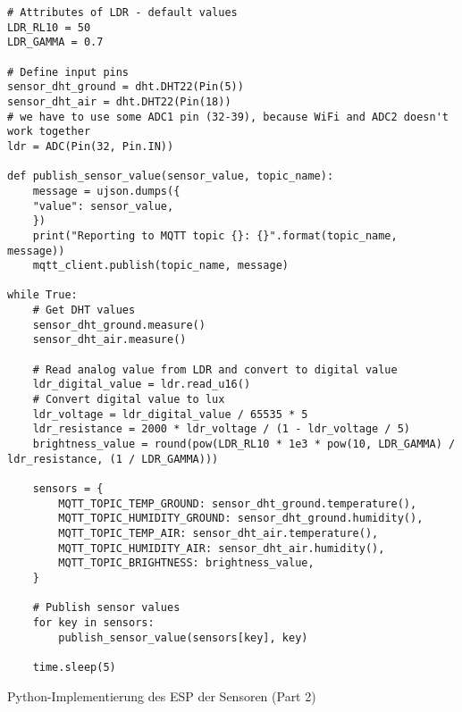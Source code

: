 \begin{listing}[!ht]
\begin{verbatim}
# Attributes of LDR - default values
LDR_RL10 = 50
LDR_GAMMA = 0.7

# Define input pins
sensor_dht_ground = dht.DHT22(Pin(5))
sensor_dht_air = dht.DHT22(Pin(18))
# we have to use some ADC1 pin (32-39), because WiFi and ADC2 doesn't work together
ldr = ADC(Pin(32, Pin.IN))

def publish_sensor_value(sensor_value, topic_name):
    message = ujson.dumps({
    "value": sensor_value,
    })
    print("Reporting to MQTT topic {}: {}".format(topic_name, message))
    mqtt_client.publish(topic_name, message)

while True:
    # Get DHT values
    sensor_dht_ground.measure()
    sensor_dht_air.measure()

    # Read analog value from LDR and convert to digital value
    ldr_digital_value = ldr.read_u16()
    # Convert digital value to lux
    ldr_voltage = ldr_digital_value / 65535 * 5
    ldr_resistance = 2000 * ldr_voltage / (1 - ldr_voltage / 5)
    brightness_value = round(pow(LDR_RL10 * 1e3 * pow(10, LDR_GAMMA) / ldr_resistance, (1 / LDR_GAMMA)))
    
    sensors = {
        MQTT_TOPIC_TEMP_GROUND: sensor_dht_ground.temperature(),
        MQTT_TOPIC_HUMIDITY_GROUND: sensor_dht_ground.humidity(),
        MQTT_TOPIC_TEMP_AIR: sensor_dht_air.temperature(),
        MQTT_TOPIC_HUMIDITY_AIR: sensor_dht_air.humidity(),
        MQTT_TOPIC_BRIGHTNESS: brightness_value,
    }

    # Publish sensor values
    for key in sensors:
        publish_sensor_value(sensors[key], key)
    
    time.sleep(5)
\end{verbatim}
\caption{Python-Implementierung des ESP der Sensoren (Part 2)}
\label{list:wokwi_sensoren2}
\end{listing}

